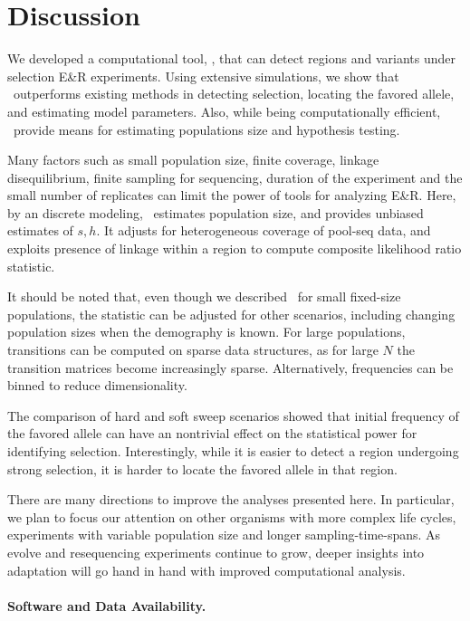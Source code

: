 \documentclass[9pt,twocolumn,twoside]{gsajnl}
\begin{document}
\section{Discussion}
We developed a computational tool, \comale, that can detect regions
and variants under selection E\&R experiments. Using extensive simulations, 
we show that \comale\
outperforms existing methods in detecting selection, locating the
favored allele, and estimating model parameters.  Also, while
being computationally efficient, \comale\ provide means for estimating
populations size and hypothesis testing.

Many factors such as small population size, finite coverage, linkage
disequilibrium, finite sampling for sequencing, duration of the
experiment and the small number of replicates can limit the power of
tools for analyzing E\&R.  Here, by an discrete modeling, \comale\
estimates population size, and provides unbiased estimates of
$s,h$. It adjusts for heterogeneous coverage of pool-seq data, and
exploits presence of linkage within a region to compute composite
likelihood ratio statistic.


It should be noted that, even though we described \comale\ for small
fixed-size populations, the statistic can be adjusted for other
scenarios, including changing population sizes when the demography is
known. For large populations, transitions can be computed on sparse
data structures, as for large $N$ the transition matrices become
increasingly sparse. Alternatively, frequencies can be binned to
reduce dimensionality.


The comparison of hard and soft sweep scenarios showed that initial
frequency of the favored allele can have an nontrivial effect on the
statistical power for identifying selection. Interestingly, while it
is easier to detect a region undergoing strong selection, it is harder
to locate the favored allele in that region.


There are many directions to improve the analyses presented here.  In
particular, we plan to focus our attention on other organisms with
more complex life cycles, experiments with variable population size
and longer sampling-time-spans. As evolve and resequencing experiments
continue to grow, deeper insights into adaptation will go hand in hand
with improved computational analysis.


\paragraph{Software and Data Availability.}
\end{document}
